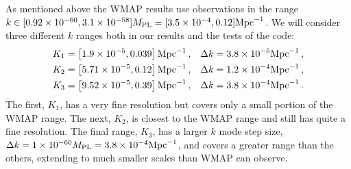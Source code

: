 As mentioned above the WMAP results \cite{Komatsu:2008hk} use
observations in the range $k\in [0.92 \times 10^{-60}, 3.1 \times
  10^{-58}]M_{\mathrm{PL}} = [3.5\times 10^{-4}, 0.12] \mathrm{Mpc}^{-1}$. We will
consider three different $k$ ranges both in our results and the tests
of the code\footnotemark:
%
\begin{align}
\label{eq:Krangedefns}
K_1 &= \left[1.9\times 10^{-5}, 0.039\right]\mathrm{Mpc}^{-1}\,, &\Delta k = 3.8\times 10^{-5}\mathrm{Mpc}^{-1}
\,,\nonumber\\
K_2 &= \left[5.71\times 10^{-5}, 0.12\right]\mathrm{Mpc}^{-1}\,, &\Delta k =
1.2\times 10^{-4}\mathrm{Mpc}^{-1}\,,
\nonumber\\ 
K_3 &= \left[9.52\times 10^{-5}, 0.39\right]\mathrm{Mpc}^{-1}\,, &\Delta k = 3.8\times 10^{-4}\mathrm{Mpc}^{-1}
\,.
\end{align}
% 
% 
The first, $K_1$, has a very fine resolution but covers only a small portion of the WMAP range. 
The next, $K_2$, is closest to the WMAP range and still has quite a fine resolution. 
The final
range, $K_3$, has a larger $k$ mode step size, $\Delta k = 1\times 10^{-60}M_{\mathrm{PL}} =
3.8\times 10^{-4}\mathrm{Mpc}^{-1}$, and
covers a greater range than the others, extending to much smaller scales than WMAP can observe.

